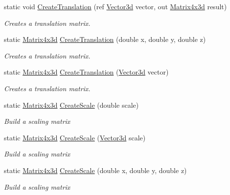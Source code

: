 \begin{DoxyCompactItemize}
static void \hyperlink{struct_open_t_k_1_1_matrix4x3d_a3271f52c949b4d0ff2c69e715628a6ea}{Create\-Translation} (ref \hyperlink{struct_open_t_k_1_1_vector3d}{Vector3d} vector, out \hyperlink{struct_open_t_k_1_1_matrix4x3d}{Matrix4x3d} result)
\begin{DoxyCompactList}\small\item\em Creates a translation matrix. \end{DoxyCompactList}\item 
static \hyperlink{struct_open_t_k_1_1_matrix4x3d}{Matrix4x3d} \hyperlink{struct_open_t_k_1_1_matrix4x3d_ab864ead74a8dad3f6b13064b571e19af}{Create\-Translation} (double x, double y, double z)
\begin{DoxyCompactList}\small\item\em Creates a translation matrix. \end{DoxyCompactList}\item 
static \hyperlink{struct_open_t_k_1_1_matrix4x3d}{Matrix4x3d} \hyperlink{struct_open_t_k_1_1_matrix4x3d_af675d17e3b3547ab2b2385637b1d7cb2}{Create\-Translation} (\hyperlink{struct_open_t_k_1_1_vector3d}{Vector3d} vector)
\begin{DoxyCompactList}\small\item\em Creates a translation matrix. \end{DoxyCompactList}\item 
static \hyperlink{struct_open_t_k_1_1_matrix4x3d}{Matrix4x3d} \hyperlink{struct_open_t_k_1_1_matrix4x3d_a8a1f0bc59344143e7262f92afe87fb40}{Create\-Scale} (double scale)
\begin{DoxyCompactList}\small\item\em Build a scaling matrix \end{DoxyCompactList}\item 
static \hyperlink{struct_open_t_k_1_1_matrix4x3d}{Matrix4x3d} \hyperlink{struct_open_t_k_1_1_matrix4x3d_a646ad0f5a33ec599053a93cb99c53e03}{Create\-Scale} (\hyperlink{struct_open_t_k_1_1_vector3d}{Vector3d} scale)
\begin{DoxyCompactList}\small\item\em Build a scaling matrix \end{DoxyCompactList}\item 
static \hyperlink{struct_open_t_k_1_1_matrix4x3d}{Matrix4x3d} \hyperlink{struct_open_t_k_1_1_matrix4x3d_acf397086ca2eae6cb26cd847ff309aef}{Create\-Scale} (double x, double y, double z)
\begin{DoxyCompactList}\small\item\em Build a scaling matrix \end{DoxyCompactList}\item 

\end{DoxyCompactItemize}
